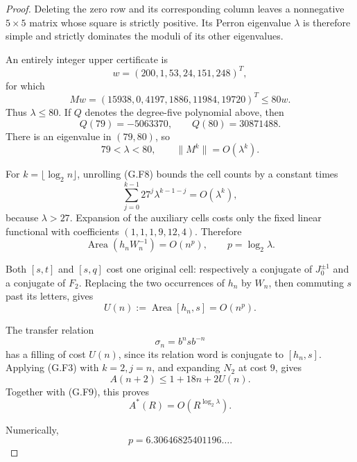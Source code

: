 \begin{proof}
Deleting the zero row and its corresponding column leaves a nonnegative \(5\times5\) matrix whose square is strictly positive. Its Perron eigenvalue \(\lambda\) is therefore simple and strictly dominates the moduli of its other eigenvalues.

An entirely integer upper certificate is
\[
w=(200,1,53,24,151,248)^T,
\]
for which
\[
Mw=(15938,0,4197,1886,11984,19720)^T\le80w.
\]
Thus \(\lambda\le80\). If \(Q\) denotes the degree-five polynomial above, then
\[
Q(79)=-5063370,\qquad Q(80)=30871488.
\]
There is an eigenvalue in \((79,80)\), so
\[
79<\lambda<80,\qquad \|M^k\|=O(\lambda^k).
\]

For \(k=\lfloor\log_2n\rfloor\), unrolling (G.F8) bounds the cell counts by a constant times
\[
\sum_{j=0}^{k-1}27^j\lambda^{k-1-j}=O(\lambda^k),
\]
because \(\lambda>27\). Expansion of the auxiliary cells costs only the fixed linear functional with coefficients \((1,1,1,9,12,4)\). Therefore
\[
\operatorname{Area}(h_nW_n^{-1})=O(n^p),
\qquad p=\log_2\lambda.
\]

Both \([s,t]\) and \([s,q]\) cost one original cell: respectively a conjugate of \(J_0^{\pm1}\) and a conjugate of \(F_2\). Replacing the two occurrences of \(h_n\) by \(W_n\), then commuting \(s\) past its letters, gives
\[
U(n):=\operatorname{Area}[h_n,s]=O(n^p). \tag{G.F9}
\]

The transfer relation
\[
\sigma_n=b^nsb^{-n}
\]
has a filling of cost \(U(n)\), since its relation word is conjugate to \([h_n,s]\). Applying (G.F3) with \(k=2,j=n\), and expanding \(N_2\) at cost \(9\), gives
\[
A(n+2)\le1+18n+2U(n).
\]
Together with (G.F9), this proves
\[
\boxed{A^*(R)=O(R^{\log_2\lambda})}.
\]

Numerically,
\[
p=6.30646825401196\ldots.
\]

\end{proof}
